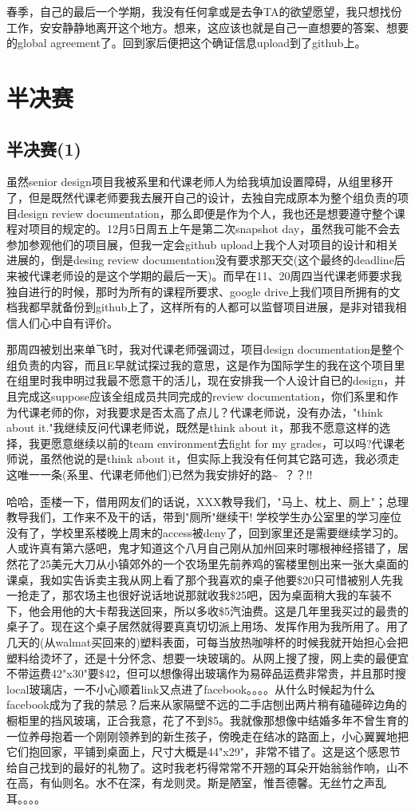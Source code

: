 \documentclass[12pt]{book}
\begin{document}
春季，自己的最后一个学期，我没有任何拿或是去争TA的欲望愿望，我只想找份工作，安安静静地离开这个地方。想来，这应该也就是自己一直想要的答案、想要的global agreement了。回到家后便把这个确证信息upload到了github上。
\chapter{半决赛}
\label{sec-35}
\section{半决赛(1)}
\label{sec-35-1}
虽然senior design项目我被系里和代课老师人为给我填加设置障碍，从组里移开了，但是既然代课老师要我去展开自己的设计，去独自完成原本为整个组负责的项目design review documentation，那么即便是作为个人，我也还是想要遵守整个课程对项目的规定的。12月5日周五上午是第二次snapshot day，虽然我可能不会去参加参观他们的项目展，但我一定会github upload上我个人对项目的设计和相关进展的，倒是desing review documentation没有要求那天交(这个最终的deadline后来被代课老师设的是这个学期的最后一天)。而早在11、20周四当代课老师要求我独自进行的时候，那时为所有的课程所要求、google drive上我们项目所拥有的文档我都早就备份到github上了，这样所有的人都可以监督项目进展，是非对错我相信人们心中自有评价。

那周四被划出来单飞时，我对代课老师强调过，项目design documentation是整个组负责的内容，而且E早就试探过我的意思，这是作为国际学生的我在这个项目里在组里时我申明过我最不愿意干的活儿，现在安排我一个人设计自已的design，并且完成这suppose应该全组成员共同完成的review documentation，你们系里和作为代课老师的你，对我要求是否太高了点儿？代课老师说，没有办法，"think about it."我继续反问代课老师说，既然是think about it，那我不愿意这样的选择，我更愿意继续以前的team environment去fight for my grades，可以吗?代课老师说，虽然他说的是think about it，但实际上我没有任何其它路可选，我必须走这唯一一条(系里、代课老师他们)已然为我安排好的路\textasciitilde{}~？？!!

哈哈，歪楼一下，借用网友们的话说，XXX教导我们，"马上、枕上、厕上"；总理教导我们，工作来不及干的话，带到"厕所"继续干! 学校学生办公室里的学习座位没有了，学校里系楼晚上周末的access被deny了，回到家里还是需要继续学习的。人或许真有第六感吧，鬼才知道这个八月自己刚从加州回来时哪根神经搭错了，居然花了25美元大刀从小镇郊外的一个农场里先前养鸡的窖楼里刨出来一张大桌面的课桌，我如实告诉卖主我从网上看了那个我喜欢的桌子他要\$20只可惜被别人先我一抢走了，那农场主也很好说话地说那就收我\$25吧，因为桌面稍大我的车装不下，他会用他的大卡帮我送回来，所以多收\$5汽油费。这是几年里我买过的最贵的桌子了。现在这个桌子居然就得要真真切切派上用场、发挥作用为我所用了。用了几天的(从walmat买回来的)塑料表面，可每当放热咖啡杯的时候我就开始担心会把塑料给烫坏了，还是十分怀念、想要一块玻璃的。从网上搜了搜，网上卖的最便宜不带运费42"x30"要\$42，但可以想像得出玻璃作为易碎品运费非常贵，并且那时搜local玻璃店，一不小心顺着link又点进了facebook。。。。从什么时候起为什么facebook成为了我的禁忌？后来从家隔壁不远的二手店刨出两片稍有磕碰碎边角的橱柜里的挡风玻璃，正合我意，花了不到\$5。我就像那想像中结婚多年不曾生育的一位养母抱着一个刚刚领养到的新生孩子，傍晚走在结冰的路面上，小心翼翼地把它们抱回家，平铺到桌面上，尺寸大概是44"x29"，非常不错了。这是这个感恩节给自己找到的最好的礼物了。这时我老朽得常常不开翘的耳朵开始翁翁作响，山不在高，有仙则名。水不在深，有龙则灵。斯是陋室，惟吾德馨。无丝竹之声乱耳。。。。
\end{document}
